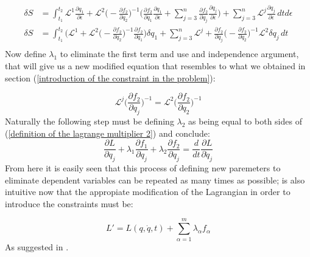 \documentclass{article}
\begin{document}
\begin{equation}
\begin{split}
\delta S &=                                                                 \int_{t_1}^{t_2} \mathscr{L}^1\frac{\partial q_1}{\partial \epsilon} + \mathscr{L}^2 \bigg(-\frac{\partial f_2}{\partial q_2} \bigg)^{-1} \bigg( \frac{\partial f_2}{\partial q_1} \frac{\partial q_1}{\partial\epsilon}+\sum_{j=3}^{n} \frac{\partial f_2}{\partial q_j} \frac{\partial q_j}{\partial\epsilon} \bigg) +                                                                    \sum_{j=3}^{n} \mathscr{L}^j \frac{\partial q_j}{\partial \epsilon} \, dtd\epsilon\\
\delta S &= \int_{t_1}^{t_2} \bigg( \mathscr{L}^1 + \mathscr{L}^2 \bigg( -\frac{\partial f_2}{\partial q_2} \bigg)^{-1} \frac{\partial f_2}{\partial q_1}  \bigg) \delta q_1 + \sum_{j=3}^{n} \mathscr{L}^j + \frac{\partial f_2}{\partial q_j}\bigg( -\frac{\partial f_2}{\partial q_2} \bigg)^{-1} \mathscr{L}^2 \delta q_j \, dt\\
\end{split}
\end{equation}
Now define $\lambda_1$ to eliminate the first term and use and independence argument, that will give us a new modified equation that resembles to what we obtained in section (\ref{introduction of the constraint in the problem}):

\begin{equation} \label{definition of the lagrange multiplier 2}
\mathscr{L}^j \bigg( \frac{\partial f_2}{\partial q_j} \bigg)^{-1}=\mathscr{L}^2 \bigg( \frac{\partial f_2}{\partial q_2} \bigg)^{-1}
\end{equation}
Naturally the following step must be defining $\lambda_2$ as being equal to both sides of (\ref{definition of the lagrange multiplier 2}) and conclude:
\begin{equation}
\frac{\partial L}{\partial q_j}  + \lambda_1 \frac{\partial f_1}{\partial q_j} + \lambda_2 \frac{\partial f_2}{\partial q_j}=\frac{d}{dt} \frac{\partial L}{\partial \dot{q}_j}
\end{equation}
From here it is easily seen that this process of defining new paremeters to eliminate dependent variables can be repeated as many times as possible; is also intuitive now that the appropiate modification of the Lagrangian in order to introduce the constraints must be: 

\begin{equation}
L' = L(q,\dot{q},t) + \sum_{\alpha=1}^{m}\lambda_{\alpha} f_{\alpha}
\end{equation}
As suggested in \cite{goldstein2002classical}\cite{marion2013classical}.
{}

\end{document}
